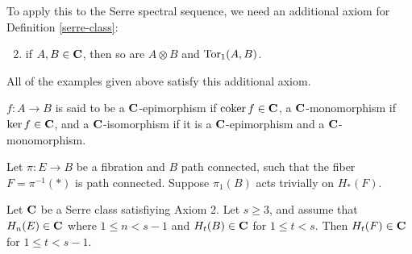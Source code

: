 To apply this to the Serre spectral sequence, we need an additional axiom for
Definition \ref{serre-class}:
\begin{enumerate}
	\setcounter{enumi}{1}
    \item if $A,B\in\mathbf C$, then so are $A\otimes B$ and $\operatorname{Tor}_1(A,B)$.
\end{enumerate}
All of the examples given above satisfy this additional axiom.
\begin{terminology}
    $f:A\to B$ is said to be a $\mathbf C$-epimorphism if $\operatorname{coker} f\in \mathbf C$, a
    $\mathbf C$-monomorphism if $\ker f\in\mathbf C$, and a $\mathbf C$-isomorphism if it is a
    $\mathbf C$-epimorphism and a $\mathbf C$-monomorphism.
\end{terminology}
\begin{prop}
    Let $\pi:E\to B$ be a fibration and $B$ path connected, such that the fiber
    $F = \pi^{-1}(\ast)$ is path connected. Suppose $\pi_1(B)$ acts trivially
    on $H_\ast(F)$.

    Let $\mathbf C$ be a Serre class satisfiying Axiom 2. Let $s\geq 3$, and assume
    that $H_n(E)\in\mathbf C$ where $1\leq n<s-1$ and $H_t(B)\in \mathbf C$ for $1\leq
    t<s$. Then $H_t(F)\in\mathbf C$ for $1\leq t<s-1$.
\end{prop}
